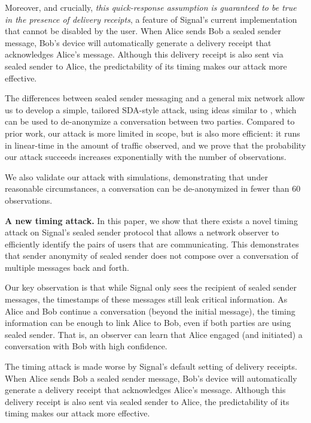 Moreover, and crucially, \emph{this quick-response assumption is guaranteed to be true
in the presence of delivery receipts}, a feature of Signal's
current implementation that cannot be disabled by the user.
When Alice sends Bob a sealed sender message, Bob's device will
automatically generate a delivery receipt that acknowledges Alice's message. Although
this delivery receipt is also sent via sealed sender to Alice, the predictability of its timing makes our attack more effective.

The differences between sealed sender messaging and a general mix network allow
us to develop a simple, tailored SDA-style attack, using ideas similar to
\cite{SDA-MD05},
which can be used to de-anonymize a conversation between two parties.
Compared to prior work, our attack is more limited in scope, but is also
more efficient: it runs in linear-time in the amount of traffic
observed, and we prove that the probability our attack succeeds increases exponentially with the number of observations.


We also validate our attack with simulations,
demonstrating that under reasonable circumstances, a conversation can be
de-anonymized in fewer than 60 observations.

\medskip
\noindent
\textbf{A new timing attack.} In this paper, we show that there exists a novel timing attack on Signal's sealed sender protocol that allows a network observer to efficiently identify the pairs of users that are communicating. This demonstrates that sender anonymity of sealed sender does not compose over a conversation of multiple messages back and forth.

Our key observation is that while Signal only sees the recipient of sealed sender 
messages, the timestamps of these messages still leak critical information.  As Alice 
and Bob continue a conversation (beyond the initial message), the timing information can be enough to link Alice to Bob, even if both parties are using sealed sender.  That is, an observer can learn that Alice engaged (and initiated) a conversation with Bob with high confidence. 


The timing attack is made worse by Signal's default setting of delivery receipts. When Alice sends Bob a sealed sender message, Bob's device will
automatically generate a delivery receipt that acknowledges Alice's message. Although
this delivery receipt is also sent via sealed sender to Alice, the predictability of its timing makes our attack more effective.
\fi

